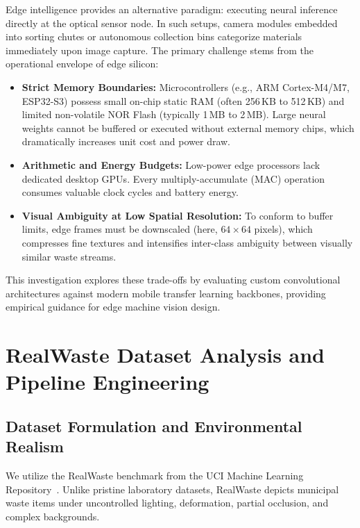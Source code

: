 \documentclass[11pt,a4paper]{article}
\begin{document}
Edge intelligence provides an alternative paradigm: executing neural inference directly at the optical sensor node. In such setups, camera modules embedded into sorting chutes or autonomous collection bins categorize materials immediately upon image capture. The primary challenge stems from the operational envelope of edge silicon:
\begin{itemize}[leftmargin=*,itemsep=1pt]
  \item \textbf{Strict Memory Boundaries:} Microcontrollers (e.g., ARM Cortex-M4/M7, ESP32-S3) possess small on-chip static RAM (often 256\,KB to 512\,KB) and limited non-volatile NOR Flash (typically 1\,MB to 2\,MB). Large neural weights cannot be buffered or executed without external memory chips, which dramatically increases unit cost and power draw.
  \item \textbf{Arithmetic and Energy Budgets:} Low-power edge processors lack dedicated desktop GPUs. Every multiply-accumulate (MAC) operation consumes valuable clock cycles and battery energy.
  \item \textbf{Visual Ambiguity at Low Spatial Resolution:} To conform to buffer limits, edge frames must be downscaled (here, $64 \times 64$ pixels), which compresses fine textures and intensifies inter-class ambiguity between visually similar waste streams.
\end{itemize}

This investigation explores these trade-offs by evaluating custom convolutional architectures against modern mobile transfer learning backbones, providing empirical guidance for edge machine vision design.

\section{RealWaste Dataset Analysis and Pipeline Engineering}
\label{sec:dataset}

\subsection{Dataset Formulation and Environmental Realism}
We utilize the RealWaste benchmark from the UCI Machine Learning Repository~\cite{realwaste2023}. Unlike pristine laboratory datasets, RealWaste depicts municipal waste items under uncontrolled lighting, deformation, partial occlusion, and complex backgrounds.
\end{document}
